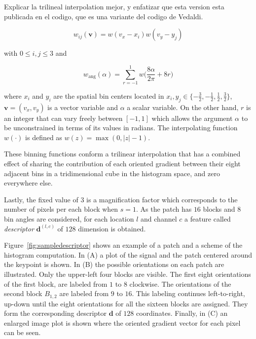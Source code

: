\documentclass[utf8]{frontiersSCNS} %
\begin{document}
Explicar la trilineal interpolation mejor, y enfatizar que esta version esta publicada en el codigo, que es una variante del codigo de Vedaldi.


\begin{equation}
 w_{ij}(\mathbf{v}) = w( v_x - x_i ) w( v_y - y_j ) 
\label{eq:ij}
\end{equation}

\noindent with $ 0 \leq i,j \leq 3$ and

\begin{equation}
 w_\mathrm{ang}(\alpha) = \sum_{r = -1 }^{1} w \bigg( \frac{8\alpha}{2\pi} + 8r \bigg)
\label{eq:wang}
\end{equation}


\noindent where $x_i$ and $y_i$ are the spatial bin centers located in $ x_i,y_j \in \{-\frac{3}{2},-\frac{1}{2},\frac{1}{2},\frac{3}{2}\} $, $\mathbf{v} = ( v_x, v_y ) $ is a vector variable and $\alpha$ a scalar variable.  On the other hand, $r$ is an integer that can vary freely between $ \left[ -1,1 \right]$ which allows the argument $\alpha$ to be unconstrained in terms of its values in radians. The interpolating function $w(\cdot)$ is defined as $ w(z) = \max(0,|z|-1)$.

These binning functions conform a trilinear interpolation that has a combined effect of sharing the contribution of each oriented gradient between their eight adjacent bins in a tridimensional cube in the histogram space, and zero everywhere else.

Lastly, the fixed value of $ 3 $ is a magnification factor which corresponds to the number of pixels per each block when $s = 1$.  As the patch has  $16$ blocks and  $8$ bin angles are considered, for each location $l$ and channel $c$ a feature called \textit{descriptor} $\mathbf{d}^{(l,c)}$  of $128$ dimension is obtained. 

Figure~\ref{fig:sampledescriptor} shows an example of a patch and a scheme of the histogram computation. In (A) a plot of the signal and the patch centered around the keypoint is shown. In (B) the possible orientations on each patch are illustrated.  Only the upper-left four blocks are visible.  The first eight orientations of the first block, are labeled from $1$ to $8$ clockwise. The orientations of the second block $ B_{1,2} $ are labeled from $9$ to $16$.  This labeling continues left-to-right, up-down until the eight orientations for all the sixteen blocks are assigned. They form the corresponding descriptor $\mathbf{d}$ of $128$ coordinates. Finally, in (C) an enlarged image plot is shown where the oriented gradient vector for each pixel can be seen.
 
\end{document}
